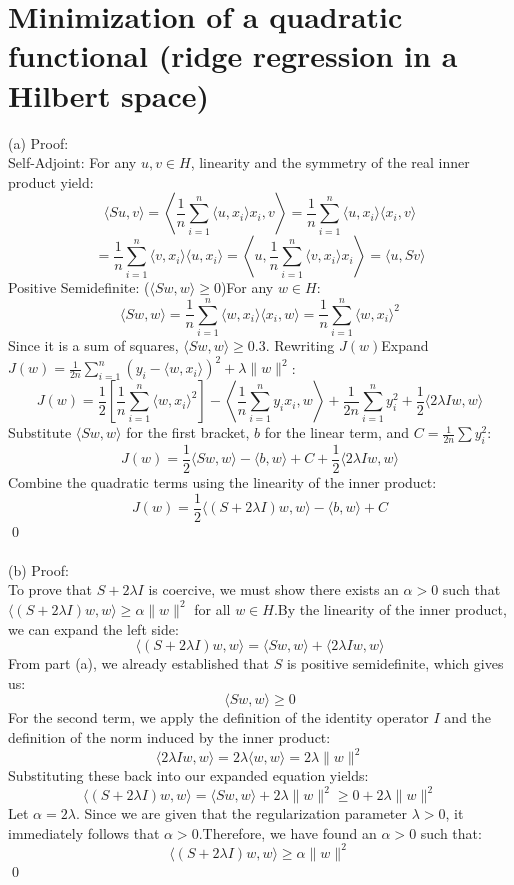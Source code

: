 \documentclass{article}
\begin{document}
\section{Minimization of a quadratic functional (ridge regression
in a Hilbert space)}
(a) Proof: 
\\
Self-Adjoint: For any $u, v \in H$, linearity and the symmetry of the real inner product yield:$$\langle Su, v \rangle = \left\langle \frac{1}{n} \sum_{i=1}^n \langle u, x_i \rangle x_i, v \right\rangle = \frac{1}{n} \sum_{i=1}^n \langle u, x_i \rangle \langle x_i, v \rangle$$$$= \frac{1}{n} \sum_{i=1}^n \langle v, x_i \rangle \langle u, x_i \rangle = \left\langle u, \frac{1}{n} \sum_{i=1}^n \langle v, x_i \rangle x_i \right\rangle = \langle u, Sv \rangle$$ Positive Semidefinite: ($\langle Sw, w \rangle \geq 0$)For any $w \in H$:$$\langle Sw, w \rangle = \frac{1}{n} \sum_{i=1}^n \langle w, x_i \rangle \langle x_i, w \rangle = \frac{1}{n} \sum_{i=1}^n \langle w, x_i \rangle^2$$Since it is a sum of squares, $\langle Sw, w \rangle \geq 0$.3. Rewriting $J(w)$Expand $J(w) = \frac{1}{2n} \sum_{i=1}^n (y_i - \langle w, x_i \rangle)^2 + \lambda \|w\|^2$:$$J(w) = \frac{1}{2} \left[ \frac{1}{n} \sum_{i=1}^n \langle w, x_i \rangle^2 \right] - \left\langle \frac{1}{n} \sum_{i=1}^n y_i x_i, w \right\rangle + \frac{1}{2n} \sum_{i=1}^n y_i^2 + \frac{1}{2} \langle 2\lambda I w, w \rangle$$Substitute $\langle Sw, w \rangle$ for the first bracket, $b$ for the linear term, and $C = \frac{1}{2n} \sum y_i^2$:$$J(w) = \frac{1}{2}\langle Sw, w\rangle - \langle b, w\rangle + C + \frac{1}{2}\langle 2\lambda I w, w\rangle$$Combine the quadratic terms using the linearity of the inner product:$$J(w) = \frac{1}{2} \langle (S + 2\lambda I)w, w \rangle - \langle b, w \rangle + C$$ \qed
\\
\\
(b) Proof: 
\\
To prove that $S + 2\lambda I$ is coercive, we must show there exists an $\alpha > 0$ such that $\langle (S + 2\lambda I)w, w \rangle \geq \alpha \|w\|^2$ for all $w \in H$.By the linearity of the inner product, we can expand the left side:$$\langle (S + 2\lambda I)w, w \rangle = \langle Sw, w \rangle + \langle 2\lambda Iw, w \rangle$$From part (a), we already established that $S$ is positive semidefinite, which gives us:$$\langle Sw, w \rangle \geq 0$$For the second term, we apply the definition of the identity operator $I$ and the definition of the norm induced by the inner product:$$\langle 2\lambda Iw, w \rangle = 2\lambda \langle w, w \rangle = 2\lambda \|w\|^2$$Substituting these back into our expanded equation yields:$$\langle (S + 2\lambda I)w, w \rangle = \langle Sw, w \rangle + 2\lambda \|w\|^2 \geq 0 + 2\lambda \|w\|^2$$Let $\alpha = 2\lambda$. Since we are given that the regularization parameter $\lambda > 0$, it immediately follows that $\alpha > 0$.Therefore, we have found an $\alpha > 0$ such that:$$\langle (S + 2\lambda I)w, w \rangle \geq \alpha \|w\|^2$$ \qed
\end{document}
